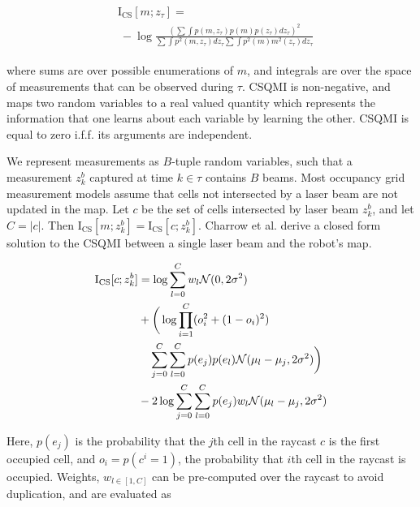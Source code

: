 \begin{align}
  \begin{split}
    &\text{I}_{\text{CS}}
    \left[
      m;
      z_{\tau}
    \right]
    = \\
    &\ -\log
    \frac
    {
      (
      \sum
      \int
      p(m, z_{\tau})
      p(m)
      p(z_{\tau})
      dz_{\tau}
      )^{2}
    }
    {
      \sum
      \int
      p^{2}(m, z_{\tau})
      dz_{\tau}
      \sum
      \int
      p^{2}(m)
      m^{2}(z_{\tau})dz_{\tau}
    }
    \label{eq:csqmi}
  \end{split}
\end{align}

where sums are over possible enumerations of $m$, and integrals are over the
space of measurements that can be observed during $\tau$. CSQMI is non-negative,
and maps two random variables to a real valued quantity
which represents the information that one learns about each variable by learning
the other. CSQMI is equal to zero i.f.f. its arguments are independent.

We represent measurements as $B$-tuple random variables, such that a measurement
$z_{k}^{b}$ captured at time $k \in \tau$ contains $B$ beams. Most occupancy grid
measurement models assume that cells not intersected
by a laser beam are not updated in the map. Let $c$ be the set of cells
intersected by laser beam $z_{k}^{b}$, and let $C = \vert c \vert$. Then
$\text{I}_{\text{CS}}[m; z_{k}^{b}] =
\text{I}_{\text{CS}}[c; z_{k}^{b}]$. Charrow et al. \cite{charrow15} derive a closed form
solution to the CSQMI between
a single laser beam and the robot's map.

\begin{align}
  \begin{split}
    \text{I}_{\text{CS}}
    [
      c;
      z_{k}^{b}
    ]
    &=
    \log
    \sum_{l=0}^{C} w_{l}
    \mc{N}(0, 2\sigma^{2}) \\
    &+ \bigg(\log
    \prod_{i=1}^{C}
    (o_{i}^{2} + (1 - o_{i})^{2}) \\
    &\ \ \ \sum_{j=0}^{C}
    \sum_{l=0}^{C}
    p(e_{j})
    p(e_{l})
    \mc{N}(\mu_{l} - \mu_{j}, 2\sigma^{2}) \bigg)\\
    &-2\log
    \sum_{j=0}^{C}
    \sum_{l=0}^{C}
    p(e_{j}) w_{l}
    \mc{N}(\mu_{l} - \mu_{j}, 2\sigma^{2})
    \label{eq:single_beam}
  \end{split}
\end{align}

Here, $p(e_j)$ is the probability that the $j$th cell in the raycast $c$ is the
first occupied cell, and $o_i = p(c^{i} = 1)$, the probability that $i$th cell
in the raycast is occupied. Weights, $w_{l \in [1, C]}$ can be pre-computed over
the raycast to avoid duplication, and are evaluated as

